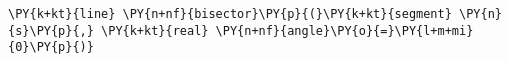 \begin{Verbatim}[commandchars=\\\{\}]
    \PY{k+kt}{line} \PY{n+nf}{bisector}\PY{p}{(}\PY{k+kt}{segment} \PY{n}{s}\PY{p}{,} \PY{k+kt}{real} \PY{n+nf}{angle}\PY{o}{=}\PY{l+m+mi}{0}\PY{p}{)}
\end{Verbatim}
